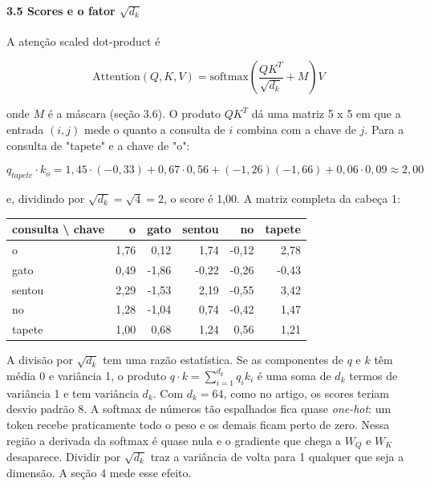 \documentclass[12pt, a4paper]{article}
\begin{document}
\paragraph{\texorpdfstring{3.5 Scores e o fator \(\sqrt{d_k}\)}{3.5 Scores e o fator \textbackslash sqrt\{d\_k\}}}\label{35-scores-e-o-fator-sqrtd_k}

A atenção scaled dot-product é

\[\text{Attention}(Q, K, V) = \text{softmax}\!\left(\frac{QK^T}{\sqrt{d_k}} + M\right) V\]

onde \(M\) é a máscara (seção 3.6). O produto \(QK^T\) dá uma matriz 5 x 5 em que a entrada \((i, j)\) mede o quanto a consulta de \(i\) combina com a chave de \(j\). Para a consulta de "tapete" e a chave de "o":

\[q_{tapete} \cdot k_{o} = 1{,}45 \cdot (-0{,}33) + 0{,}67 \cdot 0{,}56 + (-1{,}26)(-1{,}66) + 0{,}06 \cdot 0{,}09 \approx 2{,}00\]

e, dividindo por \(\sqrt{d_k} = \sqrt{4} = 2\), o score é 1,00. A matriz completa da cabeça 1:

\begin{longtable}{@{}lrrrrr@{}}
\toprule\noalign{}
consulta \textbackslash{} chave & o & gato & sentou & no & tapete \\
\midrule\noalign{}
\endhead
\bottomrule\noalign{}
\endlastfoot
o & 1,76 & 0,12 & 1,74 & -0,12 & 2,78 \\
gato & 0,49 & -1,86 & -0,22 & -0,26 & -0,43 \\
sentou & 2,29 & -1,53 & 2,19 & -0,55 & 3,42 \\
no & 1,28 & -1,04 & 0,74 & -0,42 & 1,47 \\
tapete & 1,00 & 0,68 & 1,24 & 0,56 & 1,21 \\
\end{longtable}

A divisão por \(\sqrt{d_k}\) tem uma razão estatística. Se as componentes de \(q\) e \(k\) têm média 0 e variância 1, o produto \(q \cdot k = \sum_{i=1}^{d_k} q_i k_i\) é uma soma de \(d_k\) termos de variância 1 e tem variância \(d_k\). Com \(d_k = 64\), como no artigo, os scores teriam desvio padrão 8. A softmax de números tão espalhados fica quase \emph{one-hot}: um token recebe praticamente todo o peso e os demais ficam perto de zero. Nessa região a derivada da softmax é quase nula e o gradiente que chega a \(W_Q\) e \(W_K\) desaparece. Dividir por \(\sqrt{d_k}\) traz a variância de volta para 1 qualquer que seja a dimensão. A seção 4 mede esse efeito.
\end{document}

